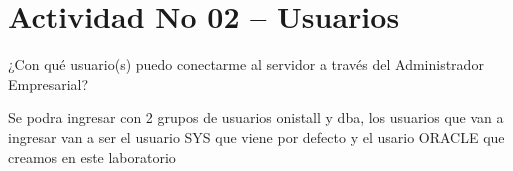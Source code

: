 \section{Actividad No 02 – Usuarios} 
¿Con qué usuario(s) puedo conectarme al servidor a través del Administrador
Empresarial?
\vspace*{0.2in}


\vspace*{0.2in}
Se podra ingresar con 2 grupos de usuarios onistall y dba, los usuarios que van a ingresar van a ser el usuario SYS que viene por defecto y el usario ORACLE que creamos en este laboratorio 



